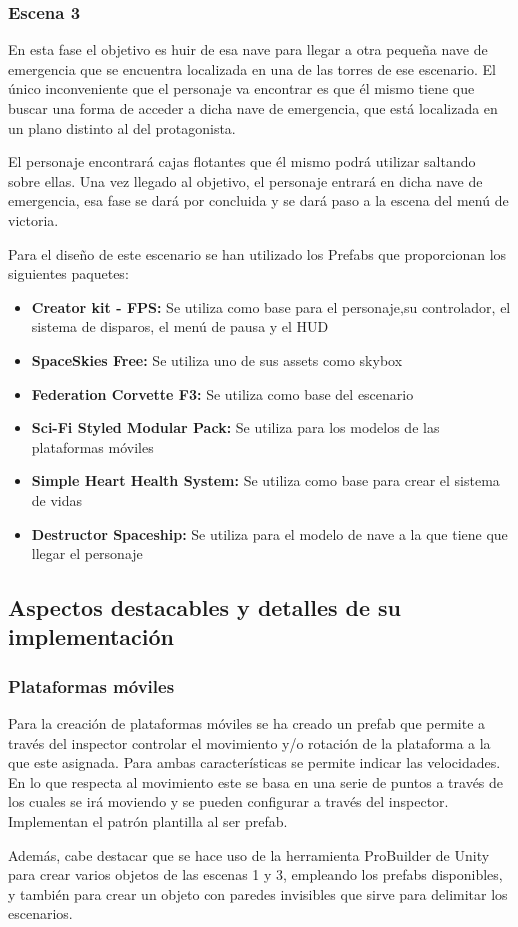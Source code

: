 \subsubsection{Escena 3}
En esta fase el objetivo es huir de esa nave para llegar a otra pequeña nave de emergencia que se encuentra localizada en una de las torres de ese escenario. El único inconveniente que el personaje va encontrar es que él mismo tiene que buscar una forma de acceder a dicha nave de emergencia, que está localizada en un plano distinto al del protagonista.

El personaje encontrará cajas flotantes que él mismo podrá utilizar saltando sobre ellas. Una vez llegado al objetivo, el personaje entrará en dicha nave de emergencia, esa fase se dará por concluida y se dará paso a la escena del menú de victoria.

Para el diseño de este escenario se han utilizado los Prefabs que proporcionan los siguientes paquetes:
\begin{itemize}
	\item \textbf{Creator kit - FPS:} Se utiliza como base para el personaje,su controlador, el sistema de disparos, el menú de pausa y el HUD
	\item \textbf{SpaceSkies Free:} Se utiliza uno de sus assets como skybox
	\item \textbf{Federation Corvette F3:} Se utiliza como base del escenario
	\item \textbf{Sci-Fi Styled Modular Pack:} Se utiliza para los modelos de las plataformas móviles
	\item \textbf{Simple Heart Health System:} Se utiliza como base para crear el sistema de vidas
	\item \textbf{Destructor Spaceship:} Se utiliza para el modelo de nave a la que tiene que llegar el personaje
\end{itemize}

\subsection{Aspectos destacables y detalles de su implementación}

\subsubsection{Plataformas móviles}
Para la creación de plataformas móviles se ha creado un prefab que permite a través del inspector controlar el movimiento y/o rotación de la plataforma a la que este asignada. Para ambas características se permite indicar las velocidades. En lo que respecta al movimiento este se basa en una serie de puntos a través de los cuales se irá moviendo y se pueden configurar a través del inspector. Implementan el patrón plantilla al ser prefab.

Además, cabe destacar que se hace uso de la herramienta ProBuilder de Unity para crear varios objetos de las escenas 1 y 3, empleando los prefabs disponibles, y también para crear un objeto con paredes invisibles que sirve para delimitar los escenarios.
